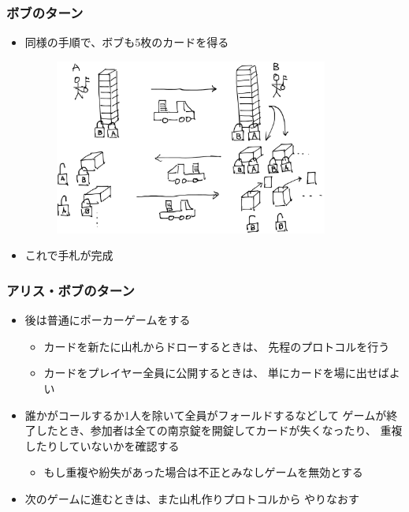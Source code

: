 
\begin{frame}
  \frametitle{\showIndex ボブのターン}

  \begin{itemize}
    \item<+-> 同様の手順で、ボブも5枚のカードを得る
    \begin{figure}[h]
      \includegraphics[width=0.85\textwidth]{img/turn_b.png}
    \end{figure}

    \item<+-> これで手札が完成
  \end{itemize}
\end{frame}


\begin{frame}
  \frametitle{\showIndex アリス・ボブのターン}

  \begin{itemize}
    \item<+-> 後は普通にポーカーゲームをする
    \begin{itemize}
      \item カードを新たに山札からドローするときは、
      先程のプロトコルを行う
      \item カードをプレイヤー全員に公開するときは、
      単にカードを場に出せばよい
    \end{itemize}

    \item<+-> 誰かがコールするか1人を除いて全員がフォールドするなどして
    ゲームが終了したとき、参加者は全ての南京錠を開錠してカードが失くなったり、
    重複したりしていないかを確認する
    \begin{itemize}
      \item<+-> もし重複や紛失があった場合は不正とみなしゲームを無効とする
    \end{itemize}

    \item<+-> 次のゲームに進むときは、また山札作りプロトコルから
    やりなおす
  \end{itemize}
\end{frame}

